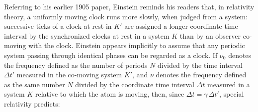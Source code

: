 \documentclass[submitted,12pt]{article}
\newcommand{\tDe}{transverse Doppler effect\xspace}
\begin{document}
Referring to his earlier 1905 paper, Einstein reminds his readers that, in relativity theory, a uniformly moving clock runs more slowly, when judged from a  system: successive ticks of a clock at rest in $K'$ are assigned a longer coordinate-time interval by the synchronized clocks at rest in a  system $K$ than by an observer co-moving with the clock. Einstein appears implicitly to assume that any periodic system passing through identical phases can be regarded as a clock. If $\nu_0$ denotes the frequency defined as the number of periods $N$ divided by the time interval $\Delta t'$ measured in the co-moving system $K'$, and $\nu$ denotes the frequency defined as the same number $N$ divided by the coordinate time interval $\Delta t$ measured in a system $K$ relative to which the atom is moving, then, since $\Delta t=\gamma\,\Delta t'$, special relativity predicts:




\end{document}
